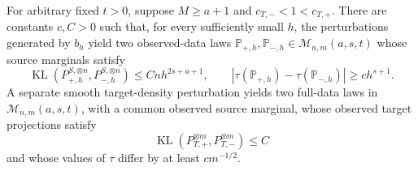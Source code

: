 For arbitrary fixed \(t>0\), suppose \(M\ge a+1\) and \(c_{T,-}<1<c_{T,+}\). There are constants \(c,C>0\) such that, for every sufficiently small \(h\), the perturbations generated by \(b_h\) yield two observed-data laws \(\mathbb P_{+,h},\mathbb P_{-,h}\in\mathcal M_{n,m}(a,s,t)\) whose source marginals satisfy
\[
\operatorname{KL}(P_{+,h}^{S,\otimes n},P_{-,h}^{S,\otimes n})\le Cnh^{2s+a+1},
\qquad
|\tau(\mathbb P_{+,h})-\tau(\mathbb P_{-,h})|\ge ch^{s+1}.
\]
A separate smooth target-density perturbation yields two full-data laws in \(\mathcal M_{n,m}(a,s,t)\), with a common observed source marginal, whose observed target projections satisfy
\[
\operatorname{KL}(P_{T,+}^{\otimes m},P_{T,-}^{\otimes m})\le C
\]
and whose values of \(\tau\) differ by at least \(cm^{-1/2}\).
